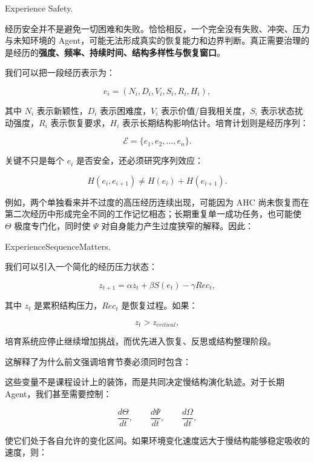 \begin{statementbox}
Experience Safety.
\end{statementbox}

经历安全并不是避免一切困难和失败。恰恰相反，一个完全没有失败、冲突、压力与未知环境的 Agent，可能无法形成真实的恢复能力和边界判断。真正需要治理的是经历的\textbf{强度、频率、持续时间、结构多样性与恢复窗口}。

我们可以把一段经历表示为：

\[
e_i=
(N_i,D_i,V_i,S_i,R_i,H_i),
\]

其中 $N_i$ 表示新颖性，$D_i$ 表示困难度，$V_i$ 表示价值/自我相关度，$S_i$ 表示状态扰动强度，$R_i$ 表示恢复要求，$H_i$ 表示长期结构影响估计。培育计划则是经历序列：

\[
\mathcal E=
\{e_1,e_2,\ldots,e_n\}.
\]

关键不只是每个 $e_i$ 是否安全，还必须研究序列效应：

\[
H(e_i,e_{i+1})
\neq
H(e_i)+H(e_{i+1}).
\]

例如，两个单独看来并不过度的高压经历连续出现，可能因为 AHC 尚未恢复而在第二次经历中形成完全不同的工作记忆相态；长期重复单一成功任务，也可能使 $\Theta$ 极度专门化，同时使 $\Psi$ 对自身能力产生过度狭窄的解释。因此：

\begin{statementbox}
ExperienceSequenceMatters.
\end{statementbox}

我们可以引入一个简化的经历压力状态：

\[
z_{t+1}
=
\alpha z_t
+
\beta S(e_t)
-
\gamma Rec_t ,
\]

其中 $z_t$ 是累积结构压力，$Rec_t$ 是恢复过程。如果：

\[
z_t>z_{critical},
\]

培育系统应停止继续增加挑战，而优先进入恢复、反思或结构整理阶段。

这解释了为什么前文强调培育节奏必须同时包含：

\begin{statementbox}
\centering
{}
\end{statementbox}

这些变量不是课程设计上的装饰，而是共同决定慢结构演化轨迹。对于长期 Agent，我们甚至需要控制：

\[
\frac{d\Theta}{dt},
\qquad
\frac{d\Psi}{dt},
\qquad
\frac{d\Omega}{dt},
\]

使它们处于各自允许的变化区间。如果环境变化速度远大于慢结构能够稳定吸收的速度，则：

